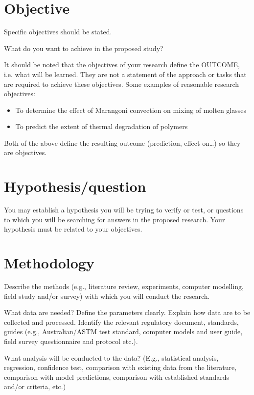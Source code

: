 \documentclass[11pt,a4paper]{scrartcl}
\begin{document}
\section{Objective}


Specific objectives should be stated.

What do you want to achieve in the proposed study?

It should be noted that the objectives of your research define the
OUTCOME, i.e. what will be learned. They are not a statement of the
approach or tasks that are required to achieve these objectives. Some
examples of reasonable research objectives:

\begin{itemize}
\item To determine the effect of Marangoni convection on mixing of molten
  glasses
\item To predict the extent of thermal degradation of polymers
\end{itemize}

Both of the above define the resulting outcome (prediction, effect
on\ldots) so they are objectives.

\section{Hypothesis/question}

You may establish a hypothesis you will be trying to verify or test, or
questions to which you will be searching for answers in the proposed
research. Your hypothesis must be related to your objectives.

\section{Methodology}

Describe the methods (e.g., literature review, experiments, computer
modelling, field study and/or survey) with which you will conduct the
research.

What data are needed? Define the parameters clearly. Explain how data
are to be collected and processed. Identify the relevant regulatory
document, standards, guides (e.g., Australian/ASTM test standard,
computer models and user guide, field survey questionnaire and protocol
etc.).

What analysis will be conducted to the data? (E.g., statistical
analysis, regression, confidence test, comparison with existing data
from the literature, comparison with model predictions, comparison with
established standards and/or criteria, etc.)
\end{document}
